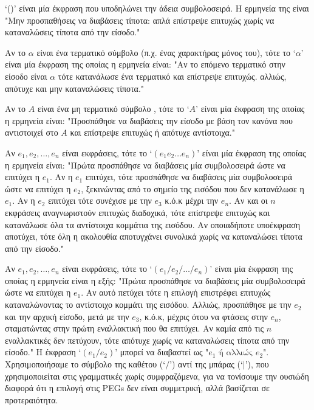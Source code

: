 \documentclass[diploma]{softlab-thesis}
\begin{document}
 \begin{description}[font=$\bullet$\scshape\bfseries]

   \item[ Κενή συμβολοσειρά:] 
	 `()' είναι μία έκφραση που υποδηλώνει την άδεια συμβολοσειρά. 
	 Η ερμηνεία της είναι "Μην προσπαθήσεις να διαβάσεις τίποτα: απλά επίστρεψε επιτυχώς χωρίς να καταναλώσεις τίποτα από την είσοδο."

   \item[ Τερματικό:] 
	 Αν το $ \alpha $ είναι ένα τερματικό σύμβολο (π.χ. ένας χαρακτήρας μόνος του), τότε το `$ \alpha$' είναι μία έκφραση της οποίας η ερμηνεία είναι: 
	 "Αν το επόμενο τερματικό στην είσοδο είναι $ \alpha $ τότε κατανάλωσε ένα τερματικό και επίστρεψε επιτυχώς. αλλιώς, απότυχε και μην καταναλώσεις τίποτα."

   \item[ Μη Τερματικό:]
	 Αν το $ A $ είναι ένα μη τερματικό σύμβολο , τότε το  `$ A $' είναι μία έκφραση της οποίας η ερμηνεία είναι:
	 "Προσπάθησε να διαβάσεις την είσοδο με βάση τον κανόνα που αντιστοιχεί στο  $ A $ και επίστρεψε επιτυχώς ή απότυχε αντίστοιχα."

   \item[ Ακολουθία:]
	 Αν $ e_1, e_2, \ldots, e_n $ είναι εκφράσεις, τότε το  `$(e_1 e_2 \ldots e_n)$' είναι μία έκφραση της οποίας η ερμηνεία είναι: 
	 "Πρώτα προσπάθησε να διαβάσεις μία συμβολοσειρά ώστε να επιτύχει η $e_1$. 
	 Αν η $ e_1$ επιτύχει, τότε προσπάθησε να διαβάσεις μία συμβολοσειρά ώστε να επιτύχει η  $e_2$, ξεκινώντας από το σημείο της εισόδου που δεν κατανάλωσε η  $e_1$. 
	 Αν η  $e_2$ επιτύχει τότε συνέχισε με  την  $e_3$ κ.ό.κ μέχρι την  $e_n$.
	 Αν και οι  $n$ εκφράσεις αναγνωριστούν επιτυχώς διαδοχικά, τότε επίστρεψε επιτυχώς και κατανάλωσε όλα τα αντίστοιχα κομμάτια της εισόδου.
	 Αν οποιαδήποτε υποέκφραση αποτύχει, τότε όλη η ακολουθία αποτυγχάνει συνολικά χωρίς να καταναλώσει τίποτα από την είσοδο."

   \item[ Διατεταγμένη Επιλογή] Αν $ e_1, e_2, \ldots, e_n $ είναι εκφράσεις, τότε το `$(e_1 / e_2 / \ldots / e_n)$' είναι μία έκφραση της οποίας η ερμηνεία είναι η εξής: 
	 "Πρώτα προσπάθησε να διαβάσεις μία συμβολοσειρά ώστε να επιτύχει η $e_1$. 
	 Αν αυτό πετύχει τότε η επιλογή επιστρέφει επιτυχώς καταναλώνοντας το αντίστοιχο κομμάτι της εισόδου.
	 Αλλιώς, προσπάθησε με την $e_2$ και την αρχική είσοδο, μετά με την $e_3$, κ.ό.κ, μέχρις ότου να φτάσεις στην $e_n$, σταματώντας στην πρώτη εναλλακτική που θα επιτύχει.
	 Αν καμία από τις $n$ εναλλακτικές δεν πετύχουν, τότε απότυχε χωρίς να καταναλώσεις τίποτα από την είσοδο."
	 Η έκφραση `$(e_1 / e_2)$' μπορεί να διαβαστεί ως "$e_1 \text{ ή αλλιώς } e_2$". 
	 Χρησιμοποιήσαμε το σύμβολο της καθέτου (`$/$') αντί της μπάρας (`$|$'), που χρησιμοποιείται στις γραμματικές χωρίς συμφραζόμενα, 
	 για να τονίσουμε την ουσιώδη διαφορά ότι η επιλογή στις PEGs δεν είναι συμμετρική, αλλά βασίζεται σε προτεραιότητα.


\end{description}
\end{document}
